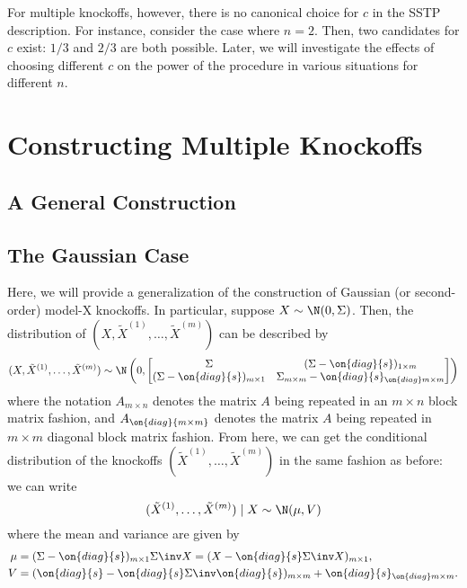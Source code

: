 For multiple knockoffs, however, there is no canonical choice for $c$ in the SSTP description. For instance, consider the case where $n = 2$. Then, two candidates for $c$ exist: $1/3$ and $2/3$ are both possible. Later, we will investigate the effects of choosing different $c$ on the power of the procedure in various situations for different $n$.

\section{Constructing Multiple Knockoffs}
\subsection{A General Construction}


\subsection{The Gaussian Case}
Here, we will provide a generalization of the construction of Gaussian (or second-order) model-X knockoffs. In particular, suppose $X \sim \N(0, \Sigma)$. Then, the distribution of $(X, \tilde{X}^{(1)}, \ldots, \tilde{X}^{(m)})$ can be described by
\[ (X, \tilde{X}^{(1)}, \ldots, \tilde{X}^{(m)}) \sim \N\left( 0, \begin{bmatrix}
	\Sigma & (\Sigma - \on{diag}\{ s \})_{1 \times m} \\
	(\Sigma - \on{diag}\{ s \})_{m \times 1} & \Sigma_{m \times m} - \on{diag}\{ s \}_{\on{diag} m \times m}
\end{bmatrix}\right) \] where the notation $A_{m \times n}$ denotes the matrix $A$ being repeated in an $m \times n$ block matrix fashion, and $A_{\on{diag}{m \times m}}$ denotes the matrix $A$ being repeated in $m \times m$ diagonal block matrix fashion. From here, we can get the conditional distribution of the knockoffs $(\tilde{X}^{(1)}, \ldots, \tilde{X}^{(m)})$ in the same fashion as before: we can write
\[ (\tilde{X}^{(1)}, \ldots, \tilde{X}^{(m)}) \mid X \sim \N(\mu, V) \] where the mean and variance are given by
\begin{align*}
\mu &= (\Sigma - \on{diag}\{ s \})_{m \times 1} \Sigma\inv X = (X - \on{diag}\{s \} \Sigma\inv X)_{m \times 1}, \\
V &= (\on{diag}\{s\} - \on{diag}\{s\}\Sigma\inv \on{diag}\{s\})_{m \times m} + \on{diag}\{s\}_{\on{diag} m \times m}.
\end{align*}